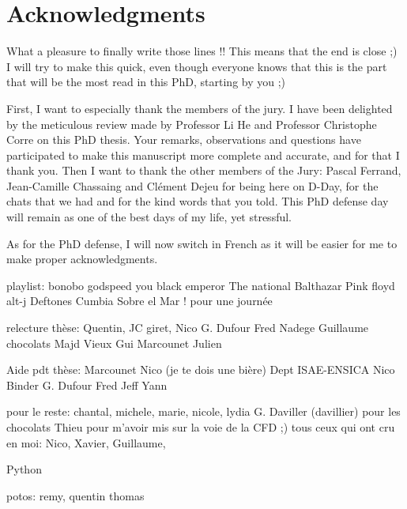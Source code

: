 
\chapter*{Acknowledgments}
\thispagestyle{empty}

What a pleasure to finally write those lines !! This means that
the end is close ;)
I will try to make this quick, even though everyone knows that this
is the part that will be the most read in this PhD, starting by you ;)

First, I want to especially thank the members of the jury. I have been
delighted by the meticulous review made by Professor Li He and Professor 
Christophe Corre on this PhD thesis. Your remarks, observations
and questions
have participated to make this manuscript more complete and accurate, and
for that I thank you.
Then I want to thank the other members of the Jury: Pascal Ferrand, 
Jean-Camille Chassaing and Clément Dejeu for being here on D-Day,
for the chats that we had
and for the kind words that you told. This PhD defense day will remain as one of the
best days of my life, yet stressful.

As for the PhD defense, I will now switch in French as it will
be easier for me to make proper acknowledgments.



playlist:
bonobo
godspeed you black emperor
The national
Balthazar
Pink floyd
alt-j
Deftones
Cumbia Sobre el Mar ! pour une journée

relecture thèse:
Quentin,
JC giret,
Nico
G. Dufour
Fred
Nadege
Guillaume chocolats
Majd
Vieux Gui
Marcounet
Julien

Aide pdt thèse:
Marcounet
Nico (je te dois une bière)
Dept ISAE-ENSICA
Nico Binder
G. Dufour
Fred
Jeff
Yann

pour le reste:
chantal, michele, marie, nicole, lydia
G. Daviller (davillier) pour les chocolats
Thieu pour m'avoir mis sur la voie de la CFD ;)
tous ceux qui ont cru en moi: Nico, Xavier, Guillaume, 

Python 

potos:
remy, quentin thomas